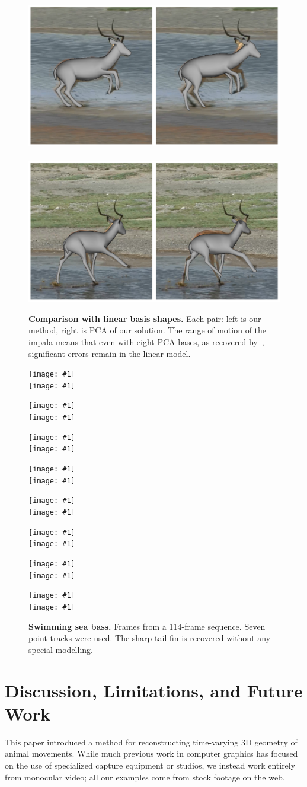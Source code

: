 \documentclass[preprint]{acmsiggraph}
\begin{document}
\begin{figure}
\begin{center}
\includegraphics[width=0.45\linewidth]{figures/lbs-comparison/34.png}~~~%
\includegraphics[width=0.45\linewidth]{figures/lbs-comparison/99.png}
\end{center}
\caption{\textbf{Comparison with linear basis shapes.} Each pair: left is our method, right is PCA of our solution. The range of motion of the impala means that even with eight PCA bases, as recovered by~\protect\cite{Cashman:2012:WSA}, significant errors remain in the linear model.
}
\label{fig:linear}

\setlength{\awfw}{0.125\linewidth}
\def\awfig#1{\texttt{[image: \#1]}}
\def\awfp#1{%
\parbox{\awfw}{%
\awfig{vid/fish/#1/0.png}\\
\awfig{vid/fish/#1/2.png}}}
\awfp{10}%
\awfp{20}%
\awfp{30}%
\awfp{40}%
\awfp{50}%
\awfp{60}%
\awfp{70}%
\awfp{80}
\caption{\textbf{Swimming sea bass.}  Frames from a 114-frame sequence.  Seven point tracks were used.   The sharp tail fin is recovered without any special modelling.}
\label{fig:fish}
\end{figure}

\section{Discussion, Limitations, and Future Work}

This paper introduced a method for reconstructing time-varying 3D
geometry of animal movements. While much previous
work in computer graphics has focused on the use of specialized
capture equipment or studios, we instead work entirely from monocular
video; all our examples come from stock footage on the web.
\end{document}
